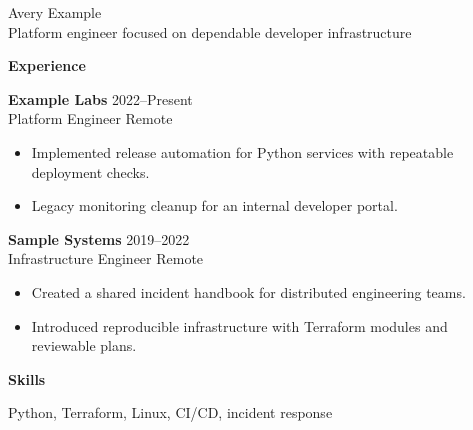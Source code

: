 \documentclass[10pt]{article}
\newlength{\cvsecbefore}
\newlength{\cvsecafter}
\newcommand{\jobheader}[4]{\textbf{#1} \hfill #4\\#2 \hfill #3\\[-2pt]}
\newcommand{\cvsection}[1]{\vspace{\cvsecbefore}\textbf{#1}\par\vspace{\cvsecafter}}
\begin{document}
\begin{center}
  {\Large Avery Example}\\
  \small Platform engineer focused on dependable developer infrastructure
\end{center}

\cvsection{Experience}
\jobheader{Example Labs}{Platform Engineer}{Remote}{2022--Present}
\begin{itemize}
  \item Implemented release automation for Python services with repeatable deployment checks.
  \item Legacy monitoring cleanup for an internal developer portal.
\end{itemize}

\jobheader{Sample Systems}{Infrastructure Engineer}{Remote}{2019--2022}
\begin{itemize}
  \item Created a shared incident handbook for distributed engineering teams.
  \item Introduced reproducible infrastructure with Terraform modules and reviewable plans.
\end{itemize}

\cvsection{Skills}
Python, Terraform, Linux, CI/CD, incident response
\end{document}
